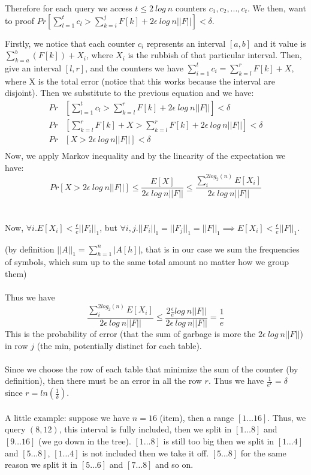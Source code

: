\documentclass[a4paper]{article}
\begin{document}
Therefore for each query we access $t \leq 2\ log\ n$ counters $c_1,c_2,...,c_t$. We then, want to proof $Pr[\sum^t_{l=1}c_l > \sum^j_{k=i}F[k] + 2\epsilon\ log\ n ||F||]<\delta$.

Firstly, we notice that each counter $c_i$ represents an interval $[a,b]$ and it value is $\sum_{k=a}^b (F[k]) + X_i$, where $X_i$ is the rubbish of that particular interval. Then, give an interval $[l,r]$, and the counters we have $\sum^t_{i=1}c_i = \sum^r_{k=l}F[k] +X $, where X is the total error (notice that this works because the interval are disjoint). Then we substitute to the previous equation and we have:
\begin{align*}
Pr &[\sum^t_{l=1}c_l > \sum^r_{k=l}F[k] + 2\epsilon\ log\ n ||F||]<\delta \\
Pr &[ \sum^r_{k=l}F[k] +X  > \sum^r_{k=l}F[k] + 2\epsilon\ log\ n ||F||]<\delta \\
Pr &[ X  >  2\epsilon\ log\ n ||F||]<\delta \\
\end{align*}
Now, we apply Markov inequality and by the linearity of the expectation we have: $$Pr [ X  >  2\epsilon\ log\ n ||F||] \leq \frac{E[X]}{2\epsilon\ log\ n ||F||} \leq \frac{\sum_{i}^{2log_2(n)} E[X_i]}{2\epsilon\ log\ n ||F||}$$
\\
\\
Now, $\forall i.E[X_i]< \frac{\epsilon}{e}||F_i||_1$, but $\forall  i, j.||F_i||_1 = ||F_j||_1 = ||F||_1 \implies E[X_i]< \frac{\epsilon}{e}||F||_1$.

\noindent
(by definition $||A||_1 = \sum^n_{h=1}|A[h]|$, that is in our case we sum the frequencies of symbols, which sum up to the same total amount no matter how we group them)
\\
\\
Thus we have $$\frac{\sum_{i}^{2log_2(n)} E[X_i]}{2\epsilon\ log\ n ||F||} \leq \frac{2 \frac{\epsilon}{e}log \ n||F||}{2\epsilon\ log\ n ||F||}= \frac{1}{e}$$
This is the probability of error (that the sum of garbage is more the $2\epsilon\ log\ n ||F||$) in row $j$ (the min, potentially distinct for each table).
\\
\\
Since we choose the row of each table that minimize the sum of the counter (by definition), then there must be an error in all the row $r$. Thus we have $\frac{1}{e^r}=\delta$ since $r=ln(\frac{1}{\delta})$.\\ \\

A little example: suppose we have $n=16$ (item), then a range $[1 \dots 16]$. Thus, we query $(8,12)$, this interval is fully included, then we split in $[1 \dots 8]$ and $[9 \dots 16]$ (we go down in the tree). $[1 \dots 8]$ is still too big then we split in $[1 \dots 4]$ and $[5 \dots 8]$,  $[1 \dots 4]$ is not included then we take it off. $[5 \dots 8]$ for the same reason we split it in $[5 \dots 6]$ and $[7 \dots 8]$ and so on.\\
\end{document}
